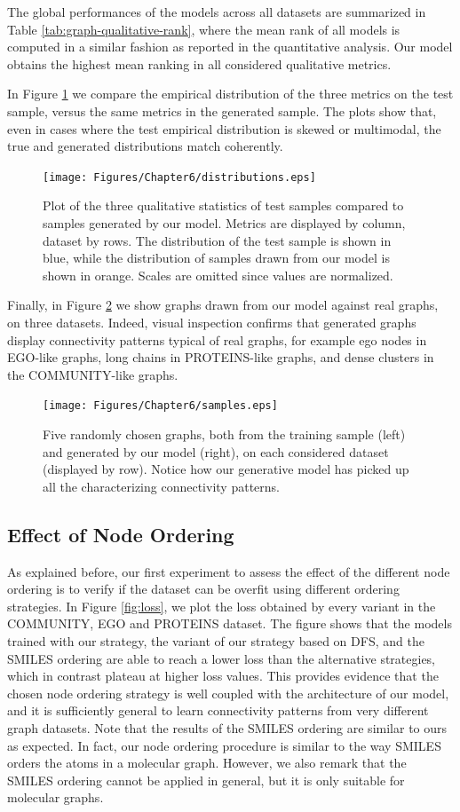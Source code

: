 The global performances of the models across all datasets are summarized in Table \ref{tab:graph-qualitative-rank}, where the mean rank of all models is computed in a similar fashion as reported in the quantitative analysis. Our model obtains the highest mean ranking in all considered qualitative metrics.

In Figure \ref{fig:distributions} we compare the empirical distribution of the three metrics on the test sample, versus the same metrics in the generated sample. The plots show that, even in cases where the test empirical distribution is skewed or multimodal, the true and generated distributions match coherently.
\begin{figure}[h!]
\centering
\texttt{[image: Figures/Chapter6/distributions.eps]}
\caption{Plot of the three qualitative statistics of test samples compared to samples generated by our model. Metrics are displayed by column, dataset by rows. The distribution of the test sample is shown in blue, while the distribution of samples drawn from our model is shown in orange. Scales are omitted since values are normalized.}
\label{fig:distributions}
\end{figure}
Finally, in Figure \ref{fig:samples} we show graphs drawn from our model against real graphs, on three datasets. Indeed, visual inspection confirms that generated graphs display connectivity patterns typical of real graphs, for example ego nodes in EGO-like graphs, long chains in PROTEINS-like graphs, and dense clusters in the COMMUNITY-like graphs.
\begin{figure}[h!]
\centering
\texttt{[image: Figures/Chapter6/samples.eps]}
\caption{Five randomly chosen graphs, both from the training sample (left) and generated by our model (right), on each considered dataset (displayed by row). Notice how our generative model has picked up all the characterizing connectivity patterns.}
\label{fig:samples}
\end{figure}

\subsection{Effect of Node Ordering}
As explained before, our first experiment to assess the effect of the different node ordering is to verify if the dataset can be overfit using different ordering strategies. In Figure \ref{fig:loss}, we plot the loss obtained by every variant in the COMMUNITY, EGO and PROTEINS dataset. The figure shows that the models trained with our strategy, the variant of our strategy based on DFS, and the SMILES ordering are able to reach a lower loss than the alternative strategies, which in contrast plateau at higher loss values. This provides evidence that the chosen node ordering strategy is well coupled with the architecture of our model, and it is sufficiently general to learn connectivity patterns from very different graph datasets. Note that the results of the SMILES ordering are similar to ours as expected. In fact, our node ordering procedure is similar to the way SMILES orders the atoms in a molecular graph. However, we also remark that the SMILES ordering cannot be applied in general, but it is only suitable for molecular graphs.

